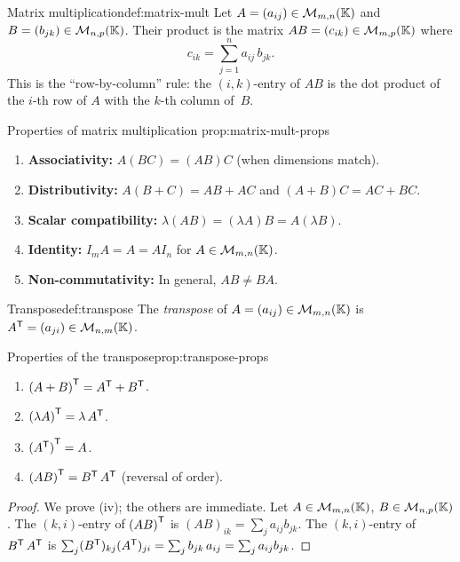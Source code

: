 \begin{definition}{Matrix multiplication}{def:matrix-mult}
Let $A = (a_{ij})\in\mathcal{M}_{m,n}({\mathbb{K}})$ and
$B = (b_{jk})\in\mathcal{M}_{n,p}({\mathbb{K}})$. Their product is the matrix
$AB = (c_{ik})\in\mathcal{M}_{m,p}({\mathbb{K}})$ where
\[
  c_{ik} = \sum_{j=1}^{n} a_{ij}\,b_{jk}.
\]
This is the ``row-by-column'' rule: the $(i,k)$-entry of $AB$ is the
dot product of the $i$-th row of $A$ with the $k$-th column of~$B$.
\end{definition}

\begin{proposition}{Properties of matrix multiplication}%
{prop:matrix-mult-props}
\begin{enumerate}[label=(\roman*)]
  \item \textbf{Associativity:} $A(BC) = (AB)C$ (when dimensions match).
  \item \textbf{Distributivity:} $A(B+C) = AB+AC$ and $(A+B)C = AC+BC$.
  \item \textbf{Scalar compatibility:} $\lambda(AB) = (\lambda A)B = A(\lambda B)$.
  \item \textbf{Identity:} $I_m A = A = A I_n$ for
    $A\in\mathcal{M}_{m,n}({\mathbb{K}})$.
  \item \textbf{Non-commutativity:} In general, $AB\neq BA$.
\end{enumerate}
\end{proposition}

\begin{definition}{Transpose}{def:transpose}
The \emph{transpose} of $A = (a_{ij})\in\mathcal{M}_{m,n}({\mathbb{K}})$ is
${A}^{\mathsf{T}} = (a_{ji})\in\mathcal{M}_{n,m}({\mathbb{K}})$.
\end{definition}

\begin{proposition}{Properties of the transpose}{prop:transpose-props}
\begin{enumerate}[label=(\roman*)]
  \item ${(A+B)}^{\mathsf{T}} = {A}^{\mathsf{T}}+{B}^{\mathsf{T}}$.
  \item ${(\lambda A)}^{\mathsf{T}} = \lambda\,{A}^{\mathsf{T}}$.
  \item ${({A}^{\mathsf{T}})}^{\mathsf{T}} = A$.
  \item ${(AB)}^{\mathsf{T}} = {B}^{\mathsf{T}}\,{A}^{\mathsf{T}}$
    \quad (reversal of order).
\end{enumerate}
\end{proposition}

\begin{proof}
We prove (iv); the others are immediate.
Let $A\in\mathcal{M}_{m,n}({\mathbb{K}})$, $B\in\mathcal{M}_{n,p}({\mathbb{K}})$. The $(k,i)$-entry of
${(AB)}^{\mathsf{T}}$ is $(AB)_{ik} = \sum_j a_{ij}b_{jk}$.
The $(k,i)$-entry of ${B}^{\mathsf{T}}\,{A}^{\mathsf{T}}$ is
$\sum_j ({B}^{\mathsf{T}})_{kj}({A}^{\mathsf{T}})_{ji}
= \sum_j b_{jk}\,a_{ij} = \sum_j a_{ij}b_{jk}$.
\end{proof}


